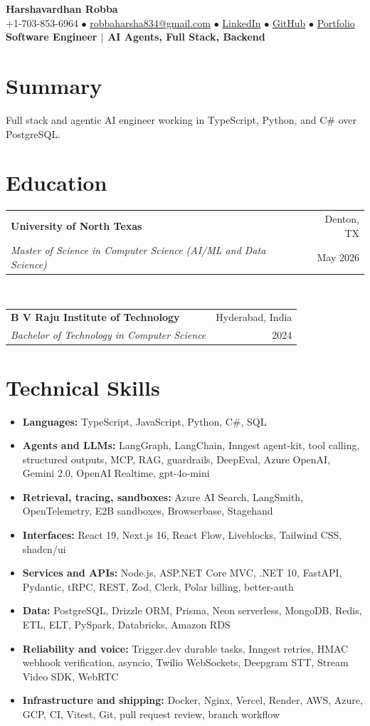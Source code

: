 \documentclass[letterpaper,10pt]{article}
\makeatletter
\newcommand{\row}[4]{\begin{tabular*}{\textwidth}[t]{l@{\extracolsep{\fill}}r}
\textbf{#1} & \small #2 \\ \textit{\small #3} & \small #4 \\ \end{tabular*}\vspace{0pt}}
\makeatother
\begin{document}
\begin{center}
{\LARGE\bfseries Harshavardhan Robba}\\[3pt]
{\footnotesize +1-703-853-6964 $\bullet$
\href{mailto:robbaharsha834@gmail.com}{robbaharsha834@gmail.com} $\bullet$
\href{https://www.linkedin.com/in/harshavardhanrobba}{LinkedIn} $\bullet$
\href{https://github.com/HarshaVardhanRobba}{GitHub} $\bullet$
\href{https://portfolio-harshavardhanrobba.vercel.app/}{Portfolio}}\\[3pt]
{\small\bfseries\color{accent} Software Engineer $|$ AI Agents, Full Stack, Backend}
\end{center}
\vspace{-8pt}

\section{Summary}
{\small Full stack and agentic AI engineer working in TypeScript, Python, and C\# over PostgreSQL.}

\section{Education}
\row{University of North Texas}{Denton, TX}{Master of Science in Computer Science (AI/ML and Data Science)}{May 2026}\\[2pt]
\row{B V Raju Institute of Technology}{Hyderabad, India}{Bachelor of Technology in Computer Science}{2024}

\section{Technical Skills}
\begin{itemize}[leftmargin=0em,label={},itemsep=1pt]
  \item \textbf{Languages:} TypeScript, JavaScript, Python, C\#, SQL
  \item \textbf{Agents and LLMs:} LangGraph, LangChain, Inngest agent-kit, tool calling, structured outputs, MCP, RAG, guardrails, DeepEval, Azure OpenAI, Gemini 2.0, OpenAI Realtime, gpt-4o-mini
  \item \textbf{Retrieval, tracing, sandboxes:} Azure AI Search, LangSmith, OpenTelemetry, E2B sandboxes, Browserbase, Stagehand
  \item \textbf{Interfaces:} React 19, Next.js 16, React Flow, Liveblocks, Tailwind CSS, shadcn/ui
  \item \textbf{Services and APIs:} Node.js, ASP.NET Core MVC, .NET 10, FastAPI, Pydantic, tRPC, REST, Zod, Clerk, Polar billing, better-auth
  \item \textbf{Data:} PostgreSQL, Drizzle ORM, Prisma, Neon serverless, MongoDB, Redis, ETL, ELT, PySpark, Databricks, Amazon RDS
  \item \textbf{Reliability and voice:} Trigger.dev durable tasks, Inngest retries, HMAC webhook verification, asyncio, Twilio WebSockets, Deepgram STT, Stream Video SDK, WebRTC
  \item \textbf{Infrastructure and shipping:} Docker, Nginx, Vercel, Render, AWS, Azure, GCP, CI, Vitest, Git, pull request review, branch workflow
\end{itemize}
\end{document}
